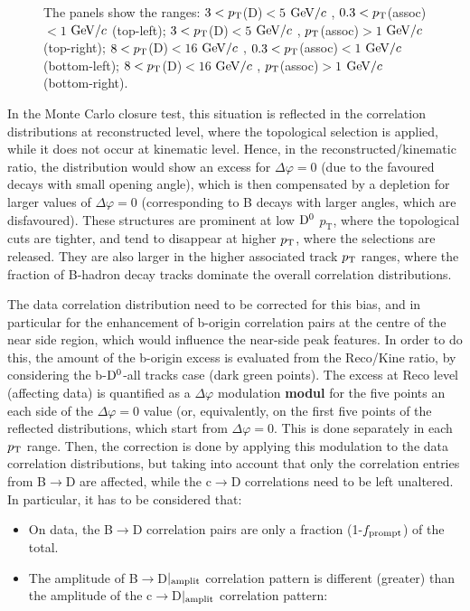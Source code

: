 \begin{figure}
{The panels show the ranges: $3 < p_{\rm T}$(D)$ < 5$ $\mathrm{GeV}/c$ , $0.3 < p_{\rm T}$(assoc)$ < 1$ $\mathrm{GeV}/c$  (top-left); $3 < p_{\rm T}$(D)$ < 5$ $\mathrm{GeV}/c$ , $p_{\rm T}$(assoc)$ > 1$ $\mathrm{GeV}/c$  (top-right); $8 < p_{\rm T}$(D)$ < 16$ $\mathrm{GeV}/c$ , $0.3 < p_{\rm T}$(assoc)$ < 1$ $\mathrm{GeV}/c$  (bottom-left); $8 < p_{\rm T}$(D)$ < 16$ $\mathrm{GeV}/c$ , $p_{\rm T}$(assoc)$ > 1$ $\mathrm{GeV}/c$  (bottom-right).}
\label{fig:MC_Ratios}
\end{figure}

In the Monte Carlo closure test, this situation is reflected in the correlation distributions at reconstructed level, where the topological selection is applied, while it does not occur at kinematic level. Hence, in the reconstructed/kinematic ratio, the distribution would show an excess for $\Delta\varphi = 0$ (due to the favoured decays with small opening angle), which is then compensated by a depletion for larger values of $\Delta\varphi = 0$ (corresponding to B decays with larger angles, which are disfavoured).
These structures are prominent at low ${\rm D^0}$ $p_\text{T}$, where the topological cuts are tighter, and tend to disappear at higher $p_{\rm T}$, where the selections are released. They are also larger in the higher associated track $p_{\rm T}$ ranges, where the fraction of B-hadron decay tracks dominate the overall correlation distributions.

The data correlation distribution need to be corrected for this bias, and in particular for the enhancement of b-origin correlation pairs at the centre of the near side region, which would influence the near-side peak features.
In order to do this, the amount of the b-origin excess is evaluated from the Reco/Kine ratio, by considering the b-${\rm D^0}$-all tracks case (dark green points). The excess at Reco level (affecting data) is quantified as a $\Delta\varphi$ modulation {\bf modul} for the five points an each side of the $\Delta\varphi = 0$ value (or, equivalently, on the first five points of the reflected distributions, which start from $\Delta\varphi=0$. This is done separately in each $p_{\rm T}$ range.
Then, the correction is done by applying this modulation to the data correlation distributions, but taking into account that only the correlation entries from B$\rightarrow$D are affected, while the c$\rightarrow$D correlations need to be left unaltered.
In particular, it has to be considered that:
\begin{itemize}
\item On data, the B$\rightarrow$D correlation pairs are only a fraction (1-$f_{\rm prompt}$) of the total.
\item The amplitude of B$\rightarrow$D$|_{\rm amplit}$ correlation pattern is different (greater) than the amplitude of the c$\rightarrow$D$|_{\rm amplit}$ correlation pattern:
\end{itemize}

